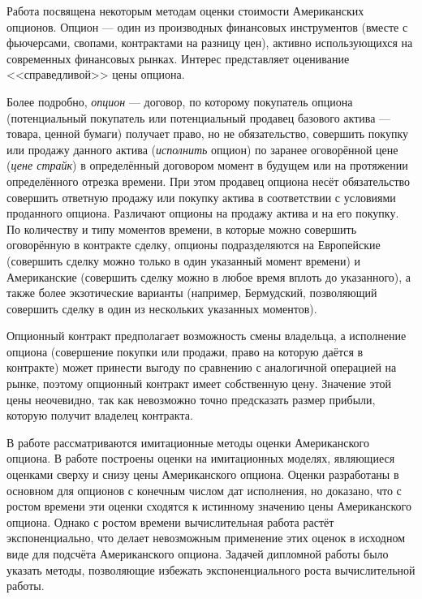 \intro
Работа посвящена некоторым методам оценки стоимости Американских опционов. Опцион --- один из производных финансовых инструментов (вместе с фьючерсами, свопами, контрактами на разницу цен), активно использующихся на современных финансовых рынках. Интерес представляет оценивание <<справедливой>> цены опциона.

Более подробно, \emph{опцион} --- договор, по которому покупатель опциона (потенциальный покупатель или потенциальный продавец базового актива — товара, ценной бумаги) получает право, но не обязательство, совершить покупку или продажу данного актива (\emph{исполнить} опцион) по заранее оговорённой цене (\emph{цене страйк}) в определённый договором момент в будущем или на протяжении определённого отрезка времени. При этом продавец опциона несёт обязательство совершить ответную продажу или покупку актива в соответствии с условиями проданного опциона. Различают опционы на продажу актива и на его покупку. По количеству и типу моментов времени, в которые можно совершить оговорённую в контракте сделку, опционы подразделяются на Европейские (совершить сделку можно только в один указанный момент времени) и Американские (совершить сделку можно в любое время вплоть до указанного), а также более экзотические варианты (например, Бермудский, позволяющий совершить сделку в один из нескольких указанных моментов).

Опционный контракт предполагает возможность смены владельца, а исполнение опциона (совершение покупки или продажи, право на которую даётся в контракте) может принести выгоду по сравнению с аналогичной операцией на рынке, поэтому опционный контракт имеет собственную цену. Значение этой цены неочевидно, так как невозможно точно предсказать размер прибыли, которую получит владелец контракта.

В работе рассматриваются имитационные методы оценки Американского опциона. В работе \cite{Broadie1997} построены оценки на имитационных моделях, являющиеся оценками сверху и снизу цены Американского опциона. Оценки разработаны в основном для опционов с конечным числом дат исполнения, но доказано, что с ростом времени эти оценки сходятся к истинному значению цены Американского опциона. Однако с ростом времени вычислительная работа растёт экспоненциально, что делает невозможным применение этих оценок в исходном виде для подсчёта Американского опциона. Задачей дипломной работы было указать методы, позволяющие избежать экспоненциального роста вычислительной работы.

